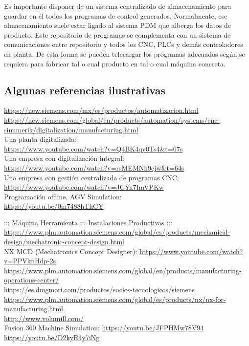 \documentclass[spanish,12pt,a4paper,final,oneside]{book}
\begin{document}
Es importante disponer de un sistema centralizado de almacenamiento para guardar en él todos los programas de control generados. Normalmente, ese almacenamiento suele estar ligado al sistema PDM que alberga los datos de producto. Este  repositorio de programas se complementa con un sistema de comunicaciones entre repositorio y todos los CNC, PLCs y demás controladores en planta. De esta forma se pueden telecargar los programas adecuados según se requiera para fabricar tal o cual producto en tal o cual máquina concreta.


\subsection*{Algunas referencias ilustrativas}
\url{https://new.siemens.com/mx/es/productos/automatizacion.html}
\\ \url{https://new.siemens.com/global/en/products/automation/systems/cnc-sinumerik/digitalization/manufacturing.html}
\\ Una planta digitalizada:
\\ \url{https://www.youtube.com/watch?v=Q4BK4qy0Ts4&t=67s}
\\ Una empresa con digitalización integral:
\\ \url{https://www.youtube.com/watch?v=rsMEMNh9ejw&t=64s}
\\ Una empresa con gestión centralizada de programas CNC:
\\ \url{https://www.youtube.com/watch?v=JCYx7ImVPKw}
\\ Programación offline, AGV Simulation:
\\ \url{https://youtu.be/0m7488hThGY}

::: Máquina Herramienta ::: Instalaciones Productivas :::
\\ {\small \url{https://www.plm.automation.siemens.com/global/es/products/mechanical-design/mechatronic-concept-design.html}}
\\ NX MCD (Mechatronics Concept Designer): \url{https://www.youtube.com/watch?v=PPVknHdp-2s}
\\ \url{https://www.plm.automation.siemens.com/global/en/products/manufacturing-operations-center/}
\\ \url{https://es.dmgmori.com/productos/socios-tecnologicos/siemens}
\\ \url{https://www.plm.automation.siemens.com/global/es/products/nx/nx-for-manufacturing.html}
\\ \url{http://www.volumill.com/}
\\Fusion 360 Machine Simulation: \url{https://youtu.be/JFPHMw78V94} \\\url{https://youtu.be/D2kyR4y7iNg}
\end{document}
